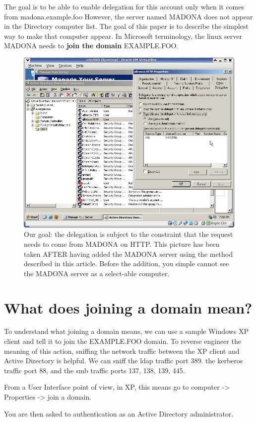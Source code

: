 \documentclass[12pt,a4]{article}
\begin{document}
The goal is to be able to enable delegation for this account only when it comes from madona.example.foo
However, the server named MADONA does not appear in the Directory computer list.
The goal of this paper is to describe the simplest way to make that computer appear. In Microsoft terminology, the linux server MADONA needs to {\bf join the domain} EXAMPLE.FOO.

\begin{figure}[h]
 \includegraphics[width=120mm]{goal}
\caption{Our goal: the delegation is subject to the constraint that the request needs to come from MADONA on HTTP. This picture has been taken AFTER having added the MADONA server using the method described in this article. Before the addition, you simple cannot see the MADONA server as a select-able computer.}
\end{figure}

\section{What does joining a domain mean?}
To understand what joining a domain means, we can use a sample Windows XP client and tell it to join the EXAMPLE.FOO domain.
To reverse engineer the meaning of this action, sniffing the network traffic between the XP client and Active Directory is helpful.
We can sniff the ldap traffic port 389. the kerberos traffic port 88, and the smb traffic ports 137, 138, 139, 445.

From a User Interface point of view, in XP, this means go to computer -> Properties -> join a domain.

You are then asked to authentication as an Active Directory administrator.
\end{document}
